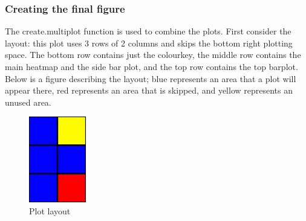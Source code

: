\documentclass[letterpaper]{article}\usepackage[]{graphicx}\usepackage[]{color}
\begin{document}
\subsubsection{Creating the final figure}

The create.multiplot function is used to combine the plots. First consider the layout: this plot uses 3 rows of 2 columns and skips the bottom right plotting space. The bottom row contains just the colourkey, the middle row contains the main heatmap and the side bar plot, and the top row contains the top barplot. Below is a figure describing the layout; blue represents an area that a plot will appear there, red represents an area that is skipped, and yellow represents an unused area.

\begin{figure}[!ht]
  \begin{center}
     \includegraphics[width=25mm]{Figures/ex2_schematic.pdf}
     \caption{Plot layout}
     \label{fig:picture}
  \end{center}
\end{figure}
\end{document}
